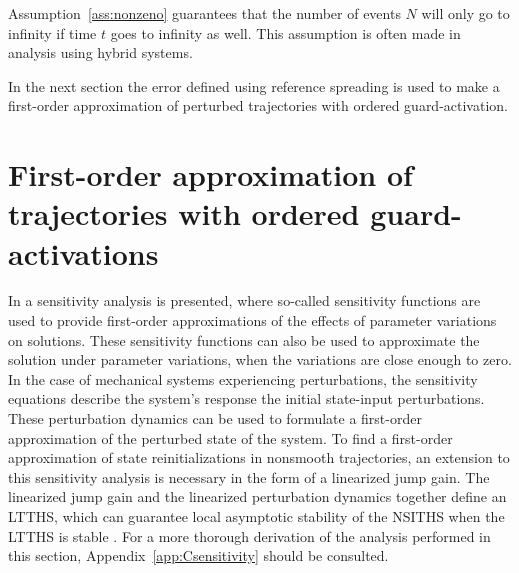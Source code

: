 \documentclass[../DC2017114Bouma.tex]{subfiles}
\begin{document}
Assumption~\ref{ass:nonzeno} guarantees that the number of events $N$ will only go to infinity if time $t$ goes to infinity as well. This assumption is often made in analysis using hybrid systems.

In the next section the error defined using reference spreading is used to make a first-order approximation of perturbed trajectories with ordered guard-activation.

\section{First-order approximation of trajectories with ordered guard-activations}
In \cite{Khalil1996} a sensitivity analysis is presented, where so-called sensitivity functions are used to provide first-order approximations of the effects of parameter variations on solutions. These sensitivity functions can also be used to approximate the solution under parameter variations, when the variations are close enough to zero. In the case of mechanical systems experiencing perturbations, the sensitivity equations describe the system's response the initial state-input perturbations. These perturbation dynamics can be used to formulate a first-order approximation of the perturbed state of the system. To find a first-order approximation of state reinitializations in nonsmooth trajectories, an extension to this sensitivity analysis is necessary in the form of a linearized jump gain. The linearized jump gain and the linearized perturbation dynamics together define an LTTHS, which can guarantee local asymptotic stability of the NSITHS when the LTTHS is stable \cite{Rijnen2017}. For a more thorough derivation of the analysis performed in this section, Appendix~\ref{app:Csensitivity} should be consulted.
\end{document}
